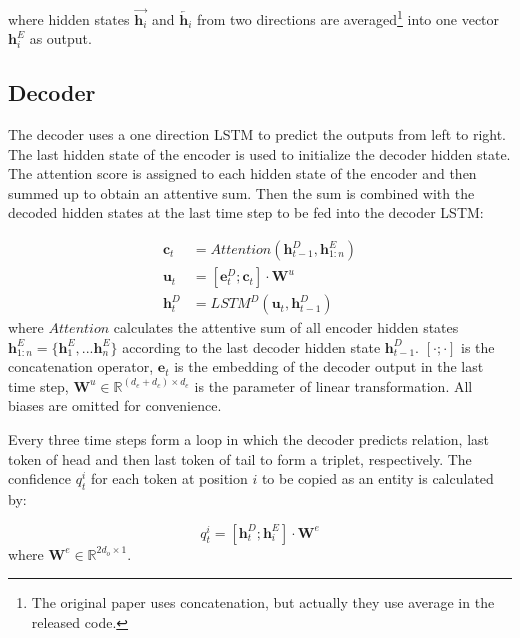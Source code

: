 \documentclass[letterpaper]{article} \usepackage{aaai20}  \usepackage{times}  \usepackage{helvet} \usepackage{courier}  \usepackage[hyphens]{url}  \usepackage{graphicx}
\begin{document}
where hidden states $\overrightarrow{\bm{h}_i}$ and $\overleftarrow{\bm{h}_i}$ from two directions are averaged\footnote{The original paper uses concatenation, but actually they use average in the released code.} into one vector $\bm{h}^E_i$ as output.
  
      
      \subsection{Decoder}
      \label{copyre_decoder}
      
      The decoder uses a one direction LSTM to predict the outputs from left to right. 
      The last hidden state of the encoder is used to initialize the decoder hidden state. 
      The attention score is assigned to each hidden state of the encoder and then summed up to obtain an attentive sum.
Then the sum is combined with the decoded hidden states at the last time step to be fed into the decoder LSTM:
      
      
      \begin{equation}
      \begin{split}
      \bm{c}_t &= Attention(\bm{h}^D_{t-1}, \bm{h}_{1:n}^E) \\
      \bm{u}_t &= [\bm{e}^D_t; \bm{c}_t] \cdot \bm{W}^u \\  
     \bm{h}^D_{t} &= LSTM^D(\bm{u}_{t}, \bm{h}^D_{t-1}) 
      \end{split}
      \label{eq:decoder}
      \end{equation}
      where $Attention$ calculates the attentive sum of all encoder hidden states $\bm{h}_{1:n}^E = \{\bm{h}^E_1,...\bm{h}^E_n\}$ according to the last decoder hidden state $\bm{h}^D_{t-1}$. $[\cdot;\cdot]$ is the concatenation operator, $\bm{e}_t$ is the embedding of  the decoder output in the last time step, $\bm{W}^u \in \mathbb{R}^{(d_e+d_c) \times d_e}$ is the parameter of linear transformation. All biases are omitted for convenience. 
      
      Every three time steps form a loop in which the decoder predicts relation, last token of head and then last token of tail to form a triplet, respectively. The confidence $q^i_{t}$ for each token at position $i$ to be copied as an entity is calculated by:
  
      \begin{equation}
       q^i_{t} = [\bm{h}_t^D;\bm{h}_i^E] \cdot \bm{W}^e \label{eq:problem}
      \end{equation}
      where $\bm{W}^{e} \in \mathbb{R}^{2d_o \times 1}$.
  
\end{document}
